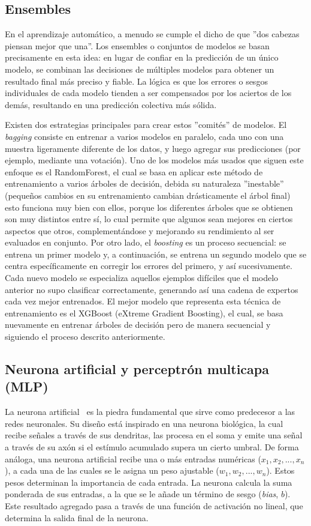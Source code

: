 \subsection{Ensembles}

En el aprendizaje automático, a menudo se cumple el dicho de que ''dos cabezas piensan mejor que una''. Los ensembles o conjuntos de modelos se basan precisamente en esta idea: en lugar de confiar en la predicción de un único modelo, se combinan las decisiones de múltiples modelos para obtener un resultado final más preciso y fiable. La lógica es que los errores o sesgos individuales de cada modelo tienden a ser compensados por los aciertos de los demás, resultando en una predicción colectiva más sólida.

Existen dos estrategias principales para crear estos ''comités'' de modelos. El \textit{bagging} consiste en entrenar a varios modelos en paralelo, cada uno con una muestra ligeramente diferente de los datos, y luego agregar sus predicciones (por ejemplo, mediante una votación). Uno de los modelos más usados que siguen este enfoque es el RandomForest, el cual se basa en aplicar este método de entrenamiento a varios árboles de decisión, debida su naturaleza ''inestable'' (pequeños cambios en su entrenamiento cambian drásticamente el árbol final) esto funciona muy bien con ellos, porque los diferentes árboles que se obtienen son muy distintos entre sí, lo cual permite que algunos sean mejores en ciertos aspectos que otros, complementándose y mejorando su rendimiento al ser evaluados en conjunto. Por otro lado, el \textit{boosting} es un proceso secuencial: se entrena un primer modelo y, a continuación, se entrena un segundo modelo que se centra específicamente en corregir los errores del primero, y así sucesivamente. Cada nuevo modelo se especializa aquellos ejemplos difíciles que el modelo anterior no supo clasificar correctamente, generando así una cadena de expertos cada vez mejor entrenados. El mejor modelo que representa esta técnica de entrenamiento es el XGBoost (eXtreme Gradient Boosting), el cual, se basa nuevamente en entrenar árboles de decisión pero de manera secuencial y siguiendo el proceso descrito anteriormente.

\subsection{Neurona artificial y perceptrón multicapa (MLP)}

La neurona artificial~\cite{mcculloch1943logical} es la piedra fundamental que sirve como predecesor a las redes neuronales. Su diseño está inspirado en una neurona biológica, la cual recibe señales a través de sus dendritas, las procesa en el soma y emite una señal a través de su axón si el estímulo acumulado supera un cierto umbral. De forma análoga, una neurona artificial recibe una o más entradas numéricas ($x_1, x_2, ..., x_n$), a cada una de las cuales se le asigna un peso ajustable ($w_1, w_2, ..., w_n$). Estos pesos determinan la importancia de cada entrada. La neurona calcula la suma ponderada de sus entradas, a la que se le añade un término de sesgo (\textit{bias}, $b$). Este resultado agregado pasa a través de una función de activación no lineal, que determina la salida final de la neurona.

